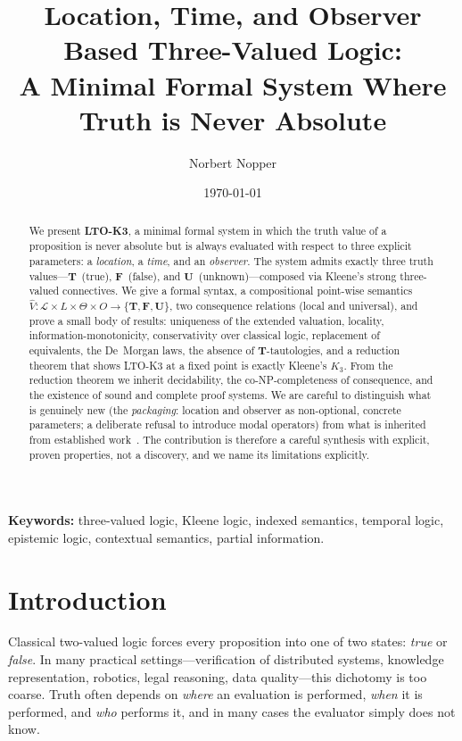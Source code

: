 \documentclass[11pt,a4paper]{article}
\title{Location, Time, and Observer Based Three-Valued Logic:\\
A Minimal Formal System Where Truth is Never Absolute}
\author{Norbert Nopper}
\date{\today}
\theoremstyle{definition}
\theoremstyle{plain}
\theoremstyle{remark}
\newcommand{\Tv}{\mathbf{T}}
\newcommand{\Fv}{\mathbf{F}}
\newcommand{\Uv}{\mathbf{U}}
\newcommand{\Vals}{\{\Tv, \Fv, \Uv\}}
\newcommand{\Vh}{\widehat{V}}
\newcommand{\Lang}{\mathcal{L}}
\begin{document}
\maketitle

\begin{abstract}
\noindent
We present \textbf{LTO-K3}, a minimal formal system in which the truth value
of a proposition is never absolute but is always evaluated with respect to
three explicit parameters: a \emph{location}, a \emph{time}, and an
\emph{observer}. The system admits exactly three truth values---$\Tv$~(true),
$\Fv$~(false), and $\Uv$~(unknown)---composed via Kleene's strong
three-valued connectives. We give a formal syntax, a compositional
point-wise semantics
$\Vh : \Lang \times L \times \Theta \times O \to \Vals$,
two consequence relations (local and universal), and prove a small body of
results: uniqueness of the extended valuation, locality,
information-monotonicity, conservativity over classical logic, replacement
of equivalents, the De~Morgan laws, the absence of $\Tv$-tautologies, and a
reduction theorem that shows LTO-K3 at a fixed point is exactly Kleene's
$K_3$. From the reduction theorem we inherit decidability, the
co-NP-completeness of consequence, and the existence of sound and complete
proof systems. We are careful to distinguish what is genuinely new (the
\emph{packaging}: location and observer as non-optional, concrete
parameters; a deliberate refusal to introduce modal operators) from what is
inherited from established work~\cite{kleene1952,lukasiewicz1920,prior1957,
hintikka1962,kripke1963}. The contribution is therefore a careful synthesis
with explicit, proven properties, not a discovery, and we name its
limitations explicitly.
\end{abstract}

\noindent\textbf{Keywords:} three-valued logic, Kleene logic, indexed
semantics, temporal logic, epistemic logic, contextual semantics, partial
information.

\section{Introduction}
\label{sec:intro}

Classical two-valued logic forces every proposition into one of two states:
\emph{true} or \emph{false}. In many practical settings---verification of
distributed systems, knowledge representation, robotics, legal reasoning,
data quality---this dichotomy is too coarse. Truth often depends on
\emph{where} an evaluation is performed, \emph{when} it is performed, and
\emph{who} performs it, and in many cases the evaluator simply does not
know.
\end{document}
